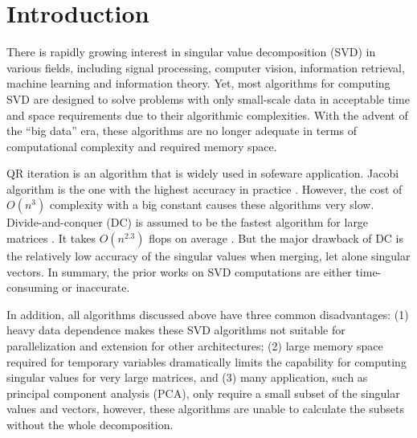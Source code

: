 \vspace{-0.1in}
\section{Introduction} \label{sec:intro}
\vspace{-0.1in}
There is rapidly growing interest in singular value decomposition (SVD) in various fields,
including signal processing, computer vision, information retrieval, machine learning and information theory.
Yet, most algorithms for computing SVD are designed to solve problems with only small-scale data in acceptable time and space requirements due to their algorithmic complexities.
With the advent of the ``big data'' era, these algorithms are no longer adequate in terms of computational complexity and required memory space.


QR iteration is an algorithm that is widely used in sofeware application.
Jacobi algorithm is the one with the highest accuracy in practice \cite{97bookalgebra}.
However, the cost of $O(n^3)$ complexity with a big constant causes these algorithms very slow.
Divide-and-conquer (DC) is assumed to be the fastest algorithm for large matrices \cite{94DCSVD}.
It takes $O(n^{2.3})$ flops on average \cite{97bookalgebra}. 
But the major drawback of DC is the relatively low accuracy of the singular values when merging, let alone singular vectors. 
In summary, the prior works on SVD computations are either time-consuming or inaccurate.

In addition, all algorithms discussed above have three common disadvantages:
(1) heavy data dependence makes these SVD algorithms not suitable for parallelization and extension for other architectures;
(2) large memory space required for temporary variables dramatically limits the capability for computing singular values for very large matrices, and
(3) many application, such as principal component analysis (PCA), only require a small subset of the singular values and vectors, however, these algorithms are unable to calculate the subsets {\color{red}without the whole decomposition}.

